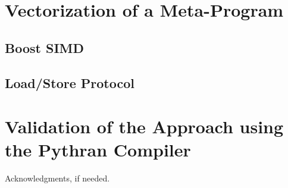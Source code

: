 \documentclass[preprint]{sigplanconf}
\begin{document}
\section{Vectorization of a Meta-Program}

\subsection{Boost SIMD}

\subsection{Load/Store Protocol}

\section{Validation of the Approach using the Pythran Compiler}

\acks

Acknowledgments, if needed.

\cite{*}



\end{document}
